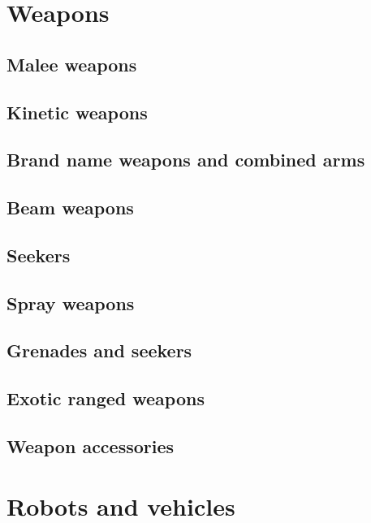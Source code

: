 \section{Weapons}
\label{sec:weapons}

\subsection{Malee weapons}
\label{sec:melee-weapons}

\subsection{Kinetic weapons}
\label{sec:kinetic-weapons}

\subsection{Brand name weapons and combined arms}
\label{sec:brand-weapons-combined}

\subsection{Beam weapons}
\label{sec:beam-weapons}

\subsection{Seekers}
\label{sec:seekers}

\subsection{Spray weapons}
\label{sec:spray-weapons}

\subsection{Grenades and seekers}
\label{sec:grenades-seekers}

\subsection{Exotic ranged weapons}
\label{sec:exotic-ranged-weapons}

\subsection{Weapon accessories}
\label{sec:weapon-accessories}

\section{Robots and vehicles}
\label{sec:robots-vehicles}

